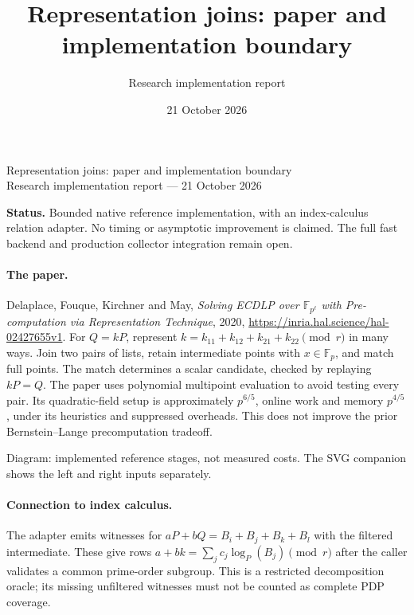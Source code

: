 \documentclass[10pt]{article}
\title{Representation joins: paper and implementation boundary}
\author{Research implementation report}
\date{21 October 2026}
\begin{document}
\begin{center}\Large Representation joins: paper and implementation boundary\\[4pt]
\normalsize Research implementation report --- 21 October 2026\end{center}
\noindent\textbf{Status.} Bounded native reference implementation, with an index-calculus
relation adapter. No timing or asymptotic improvement is claimed. The full
fast backend and production collector integration remain open.

\paragraph{The paper.} Delaplace, Fouque, Kirchner and May,
\emph{Solving ECDLP over $\mathbb F_{p^\ell}$ with Pre-computation via
Representation Technique}, 2020, \url{https://inria.hal.science/hal-02427655v1}.
For $Q=kP$, represent $k=k_{11}+k_{12}+k_{21}+k_{22}\pmod r$ in many ways.
Join two pairs of lists, retain intermediate points with $x\in\mathbb F_p$,
and match full points. The match determines a scalar candidate, checked by
replaying $kP=Q$. The paper uses polynomial multipoint evaluation to avoid
testing every pair. Its quadratic-field setup is approximately $p^{6/5}$,
online work and memory $p^{4/5}$, under its heuristics and suppressed overheads.
This does not improve the prior Bernstein--Lange precomputation tradeoff.

\begin{center}
\end{center}
\noindent Diagram: implemented reference stages, not measured costs. The SVG
companion shows the left and right inputs separately.

\paragraph{Connection to index calculus.} The adapter emits witnesses for
$aP+bQ=B_i+B_j+B_k+B_l$ with the filtered intermediate. These give rows
$a+bk=\sum_j c_j\log_P(B_j)\pmod r$ after the caller validates a common
prime-order subgroup. This is a restricted decomposition oracle; its missing
unfiltered witnesses must not be counted as complete PDP coverage.
\end{document}
